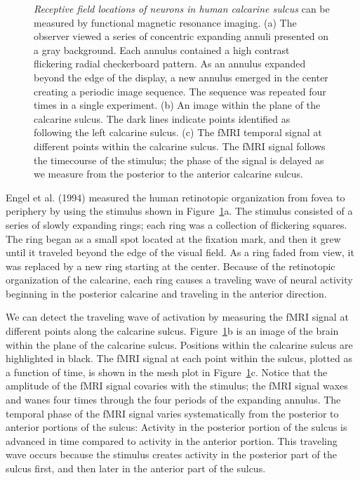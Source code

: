 \begin{figure}
\centerline{
}
\caption[Retinotopic organization of human area V1]{
{\em Receptive field locations of neurons in human calcarine sulcus}
can be measured by functional magnetic resonance imaging.
(a) The observer viewed a series of concentric expanding annuli
presented on a gray background.
Each annulus contained a
high contrast flickering radial checkerboard pattern.
As an annulus expanded beyond the edge
of the display, a new annulus emerged in the center
creating a periodic image sequence.
The sequence was repeated four times in a single experiment.
(b) An image within the plane of the calcarine sulcus.
The dark lines indicate points identified
as following the left calcarine sulcus.
(c) The fMRI temporal signal at different
points within the calcarine sulcus.
The fMRI signal follows the timecourse of
the stimulus;
the phase of the signal is delayed
as we measure from the posterior to the anterior
calcarine sulcus.
}
\label{f5:retinotopy}
\end{figure}
Engel et al. (1994) measured the human retinotopic organization from
fovea to periphery by using the stimulus 
shown in Figure~\ref{f5:retinotopy}a.
The stimulus consisted of a series of slowly expanding rings;
each ring was a collection of flickering squares.
The ring began as a small spot located at the fixation mark,
and then it grew until it traveled beyond
the edge of the visual field.
As a ring faded from view, it was replaced by
a new ring starting at the center.
Because of the retinotopic organization of the calcarine,
each ring causes a traveling wave of neural
activity beginning in the posterior calcarine
and traveling in the anterior direction.

We can detect the traveling
wave of activation by measuring the fMRI signal 
at different points along the calcarine sulcus.
Figure~\ref{f5:retinotopy}b is an image
of the brain within the plane of the calcarine sulcus.
Positions within the calcarine
sulcus are highlighted in black.
The fMRI signal at each point within the sulcus,
plotted as a function of time, is shown in the
mesh plot in Figure~\ref{f5:retinotopy}c.
Notice that the amplitude of the fMRI
signal covaries with the stimulus;
the fMRI signal waxes and wanes four times
through the four periods of the expanding annulus.
The temporal phase of the fMRI signal varies systematically
from the posterior to anterior portions of the sulcus:
Activity in the posterior portion of the sulcus
is advanced in time compared to activity
in the anterior portion.
This traveling wave occurs because 
the stimulus creates activity in the posterior
part of the sulcus first, and then later in the
anterior part of the sulcus.

